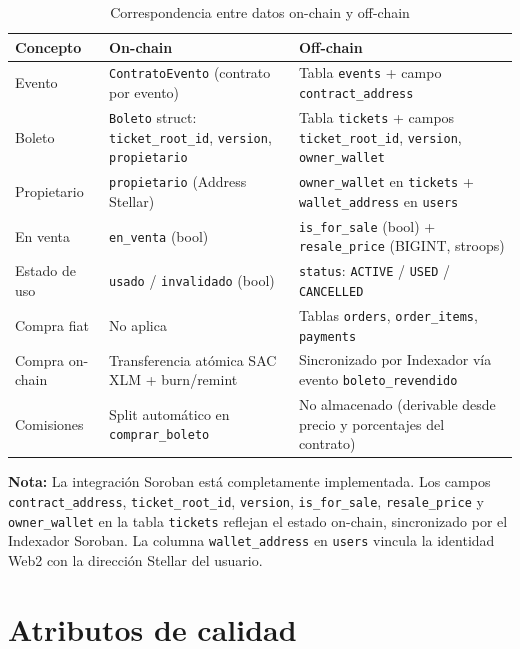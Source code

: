 \documentclass[12pt,oneside]{article}
\begin{document}
\begin{table}[htbp]
\centering
\caption{Correspondencia entre datos on-chain y off-chain}
\begin{tabularx}{\textwidth}{p{2.6cm} p{5.2cm} X}
\toprule
\textbf{Concepto} & \textbf{On-chain} & \textbf{Off-chain} \\
\midrule
Evento & \texttt{ContratoEvento} (contrato por evento) & Tabla \texttt{events} + campo \texttt{contract\_address} \\
Boleto & \texttt{Boleto} struct: \texttt{ticket\_root\_id}, \texttt{version}, \texttt{propietario} & Tabla \texttt{tickets} + campos \texttt{ticket\_root\_id}, \texttt{version}, \texttt{owner\_wallet} \\
Propietario & \texttt{propietario} (Address Stellar) & \texttt{owner\_wallet} en \texttt{tickets} + \texttt{wallet\_address} en \texttt{users} \\
En venta & \texttt{en\_venta} (bool) & \texttt{is\_for\_sale} (bool) + \texttt{resale\_price} (BIGINT, stroops) \\
Estado de uso & \texttt{usado} / \texttt{invalidado} (bool) & \texttt{status}: \texttt{ACTIVE} / \texttt{USED} / \texttt{CANCELLED} \\
Compra fiat & No aplica & Tablas \texttt{orders}, \texttt{order\_items}, \texttt{payments} \\
Compra on-chain & Transferencia atómica SAC XLM + burn/remint & Sincronizado por Indexador vía evento \texttt{boleto\_revendido} \\
Comisiones & Split automático en \texttt{comprar\_boleto} & No almacenado (derivable desde precio y porcentajes del contrato) \\
\bottomrule
\end{tabularx}
\end{table}

\textbf{Nota:} La integración Soroban está completamente implementada. Los campos \texttt{contract\_address}, \texttt{ticket\_root\_id}, \texttt{version}, \texttt{is\_for\_sale}, \texttt{resale\_price} y \texttt{owner\_wallet} en la tabla \texttt{tickets} reflejan el estado on-chain, sincronizado por el Indexador Soroban. La columna \texttt{wallet\_address} en \texttt{users} vincula la identidad Web2 con la dirección Stellar del usuario.

\FloatBarrier
\clearpage
\section{Atributos de calidad}
\label{sec:calidad}
\end{document}
